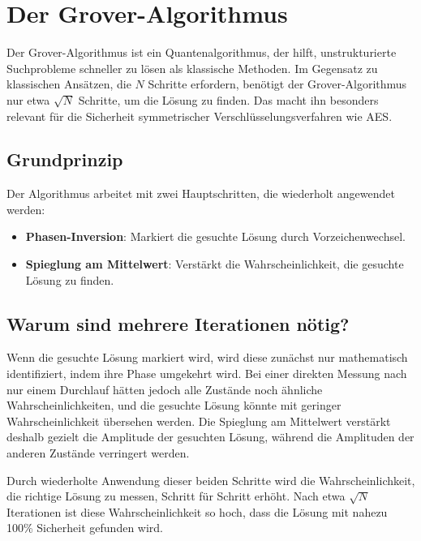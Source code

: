 \section{Der Grover-Algorithmus}
\label{sec:grover}
Der Grover-Algorithmus ist ein Quantenalgorithmus, der hilft, unstrukturierte Suchprobleme schneller zu lösen 
als klassische Methoden. Im Gegensatz zu klassischen Ansätzen, die $N$ Schritte erfordern, benötigt der 
Grover-Algorithmus nur etwa $\sqrt{N}$ Schritte, um die Lösung zu finden. Das macht ihn besonders relevant 
für die Sicherheit symmetrischer Verschlüsselungsverfahren wie AES.

\subsection{Grundprinzip}
Der Algorithmus arbeitet mit zwei Hauptschritten, die wiederholt angewendet werden:
\begin{itemize}
    \item \textbf{Phasen-Inversion}: Markiert die gesuchte Lösung durch Vorzeichenwechsel.
    \item \textbf{Spieglung am Mittelwert}: Verstärkt die Wahrscheinlichkeit, die gesuchte Lösung zu finden.
\end{itemize}

\subsection{Warum sind mehrere Iterationen nötig?}
Wenn die gesuchte Lösung markiert wird, wird diese zunächst nur mathematisch identifiziert, indem ihre Phase 
umgekehrt wird. Bei einer direkten Messung nach nur einem Durchlauf hätten jedoch alle Zustände noch ähnliche 
Wahrscheinlichkeiten, und die gesuchte Lösung könnte mit geringer Wahrscheinlichkeit übersehen werden. Die 
Spieglung am Mittelwert verstärkt deshalb gezielt die Amplitude der gesuchten Lösung, während die Amplituden der anderen 
Zustände verringert werden. 

Durch wiederholte Anwendung dieser beiden Schritte wird die Wahrscheinlichkeit, die richtige Lösung zu messen, 
Schritt für Schritt erhöht. Nach etwa $\sqrt{N}$ Iterationen ist diese Wahrscheinlichkeit so hoch, dass die Lösung 
mit nahezu 100\% Sicherheit gefunden wird.

